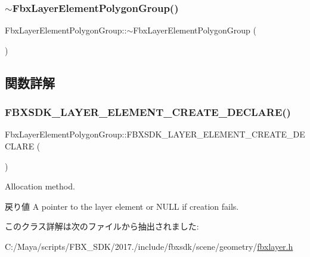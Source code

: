 \subsubsection{\texorpdfstring{$\sim$\+Fbx\+Layer\+Element\+Polygon\+Group()}{~FbxLayerElementPolygonGroup()}}
{\footnotesize\ttfamily Fbx\+Layer\+Element\+Polygon\+Group\+::$\sim$\+Fbx\+Layer\+Element\+Polygon\+Group (\begin{DoxyParamCaption}{ }\end{DoxyParamCaption})\hspace{0.3cm}{\ttfamily [protected]}}



\subsection{関数詳解}
\mbox{\label{class_fbx_layer_element_polygon_group_a604999a25c284efdfe88b784b468604e}} 
\subsubsection{\texorpdfstring{F\+B\+X\+S\+D\+K\+\_\+\+L\+A\+Y\+E\+R\+\_\+\+E\+L\+E\+M\+E\+N\+T\+\_\+\+C\+R\+E\+A\+T\+E\+\_\+\+D\+E\+C\+L\+A\+R\+E()}{FBXSDK\_LAYER\_ELEMENT\_CREATE\_DECLARE()}}
{\footnotesize\ttfamily Fbx\+Layer\+Element\+Polygon\+Group\+::\+F\+B\+X\+S\+D\+K\+\_\+\+L\+A\+Y\+E\+R\+\_\+\+E\+L\+E\+M\+E\+N\+T\+\_\+\+C\+R\+E\+A\+T\+E\+\_\+\+D\+E\+C\+L\+A\+RE (\begin{DoxyParamCaption}\item[{Layer\+Element\+Polygon\+Group}]{ }\end{DoxyParamCaption})}

Allocation method. \begin{DoxyReturn}{戻り値}
A pointer to the layer element or {\ttfamily N\+U\+LL} if creation fails. 
\end{DoxyReturn}


このクラス詳解は次のファイルから抽出されました\+:\begin{DoxyCompactItemize}
\item 
C\+:/\+Maya/scripts/\+F\+B\+X\+\_\+\+S\+D\+K/2017./include/fbxsdk/scene/geometry/\hyperlink{fbxlayer_8h}{fbxlayer.\+h}\end{DoxyCompactItemize}
